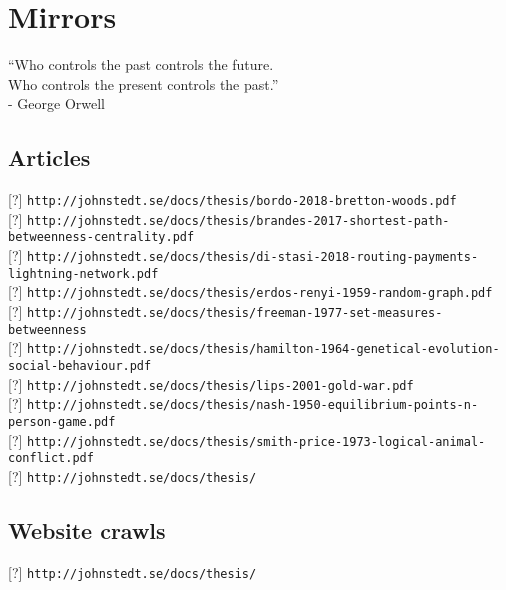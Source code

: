 \chapter{Mirrors}

\begin{displayquote}
	\centering
	“Who controls the past controls the future.
	\\ Who controls the present controls the past.”
	\\ - George Orwell 
	
\end{displayquote}


\section{Articles}
{\setlength{\parindent}{0cm}

{[?]} \texttt{http://johnstedt.se/docs/thesis/bordo-2018-bretton-woods.pdf} \\ 
{[?]} \texttt{http://johnstedt.se/docs/thesis/brandes-2017-shortest-path-betweenness-centrality.pdf }\\
{[?]} \texttt{http://johnstedt.se/docs/thesis/di-stasi-2018-routing-payments-lightning-network.pdf } \\
{[?]} \texttt{http://johnstedt.se/docs/thesis/erdos-renyi-1959-random-graph.pdf } \\
{[?]} \texttt{http://johnstedt.se/docs/thesis/freeman-1977-set-measures-betweenness } \\
{[?]} \texttt{http://johnstedt.se/docs/thesis/hamilton-1964-genetical-evolution-social-behaviour.pdf }\\
{[?]} \texttt{http://johnstedt.se/docs/thesis/lips-2001-gold-war.pdf } \\
{[?]} \texttt{http://johnstedt.se/docs/thesis/nash-1950-equilibrium-points-n-person-game.pdf } \\
{[?]} \texttt{http://johnstedt.se/docs/thesis/smith-price-1973-logical-animal-conflict.pdf } \\


{[?]} \texttt{http://johnstedt.se/docs/thesis/ } \\
}

\section{Website crawls}
{\setlength{\parindent}{0cm}
		
	
	{[?]} \texttt{http://johnstedt.se/docs/thesis/ } \\
}